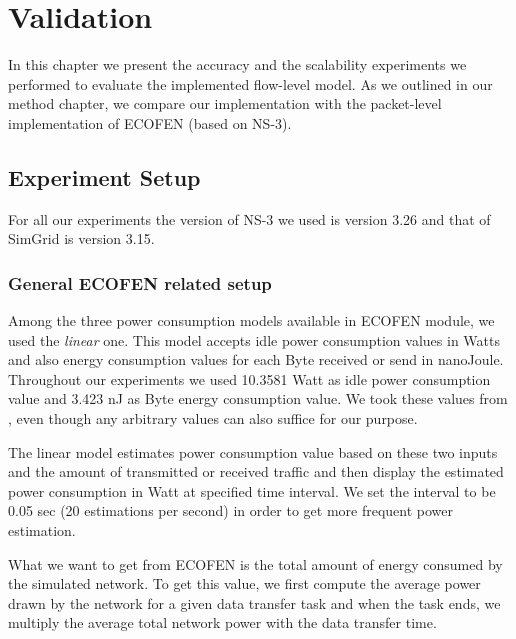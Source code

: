 \chapter{Validation}
\label{chapter:evaluation}
In this chapter we present the accuracy and the scalability experiments we performed to evaluate the implemented flow-level model. As we outlined in our method chapter, we compare our implementation with the packet-level implementation of ECOFEN (based on NS-3).  
\section{Experiment Setup}
For all our experiments the version of NS-3 we used is version 3.26 and that of SimGrid is version 3.15. 
\subsection{General ECOFEN related setup}
Among the three power consumption models available in ECOFEN module, we used the \emph{linear} one. This model accepts idle power consumption values in Watts and also energy consumption values for each Byte received or send in nanoJoule. Throughout our experiments we used 10.3581 Watt as idle power consumption value and 3.423 nJ as Byte energy consumption value. We took these values from \cite{Sivaraman}, even though any arbitrary values can also suffice for our purpose.


The linear model estimates power consumption value based on these two inputs and the amount of transmitted or received traffic and then display the estimated power consumption in Watt at specified time interval. We set the interval to be 0.05 sec (20 estimations per second) in order to get more frequent power estimation. 

What we want to get from ECOFEN is the total amount of energy consumed by the simulated network. To get this value, we first compute the average power drawn by the network for a given data transfer task and when the task ends, we multiply the average total network power with the data transfer time. 

